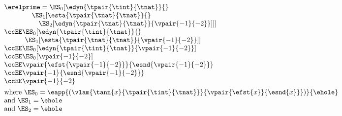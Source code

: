 $\begin{array}{l}
  \erelprime = \ES_0[\edyn{\tpair{\tint}{\tnat}}{}
\\\qquad\quad\quad \ES_1[\esta{\tpair{\tnat}{\tnat}}{}
\\\qquad\quad\quad\quad \ES_2[\edyn{\tpair{\tnat}{\tnat}}{\vpair{-1}{-2}}]]]
\\\ccEE \ES_0[\edyn{\tpair{\tint}{\tnat}}{}
\\\qquad\quad \ES_1[\esta{\tpair{\tnat}{\tnat}}{\vpair{-1}{-2}}]]
\\\ccEE \ES_0[\edyn{\tpair{\tint}{\tnat}}{\vpair{-1}{-2}}]
\\\ccEE \ES_0[\vpair{-1}{-2}]
\\\ccEE \vpair{\efst{\vpair{-1}{-2}}}{\esnd{\vpair{-1}{-2}}}
\\\ccEE \vpair{-1}{\esnd{\vpair{-1}{-2}}}
\\\ccEE \vpair{-1}{-2}
\\[1ex]
  \mbox{where } \ES_0 = \eapp{(\vlam{\tann{x}{\tpair{\tint}{\tnat}}}{\vpair{\efst{x}}{\esnd{x}}})}{\ehole}
\\\mbox{and } \ES_1 = \ehole
\\\mbox{and } \ES_2 = \ehole
\end{array}$
